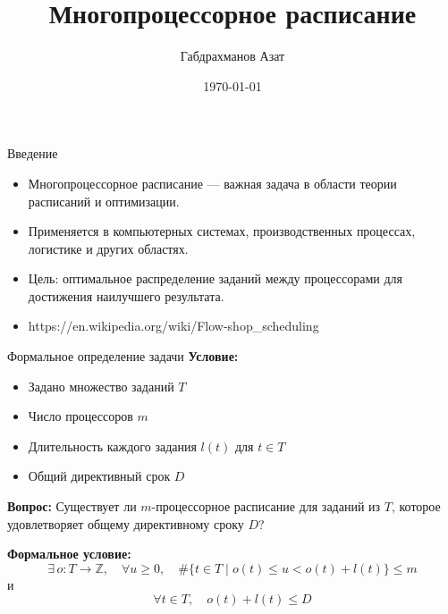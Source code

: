 \documentclass{beamer}
\title{Многопроцессорное расписание}
\author{Габдрахманов Азат}
\date{\today}
\begin{document}
\begin{frame}
    \titlepage
\end{frame}

\begin{frame}{Введение}
    \begin{itemize}
        \item Многопроцессорное расписание — важная задача в области теории расписаний и оптимизации.
        \item Применяется в компьютерных системах, производственных процессах, логистике и других областях.
        \item Цель: оптимальное распределение заданий между процессорами для достижения наилучшего результата.
        \item https://en.wikipedia.org/wiki/Flow-shop_scheduling
    \end{itemize}
\end{frame}

\begin{frame}{Формальное определение задачи}
    \textbf{Условие:}
    \begin{itemize}
        \item Задано множество заданий \( T \)
        \item Число процессоров \( m \)
        \item Длительность каждого задания \( l(t) \) для \( t \in T \)
        \item Общий директивный срок \( D \)
    \end{itemize}
    
    \textbf{Вопрос:}
    Существует ли \( m \)-процессорное расписание для заданий из \( T \), которое удовлетворяет общему директивному сроку \( D \)?
    
    \textbf{Формальное условие:}
    \[
    \exists \, o: T \rightarrow \mathbb{Z}, \quad \forall u \geq 0, \quad \#\{ t \in T \mid o(t) \leq u < o(t) + l(t) \} \leq m
    \]
    и
    \[
    \forall t \in T, \quad o(t) + l(t) \leq D
    \]
\end{frame}
\end{document}
